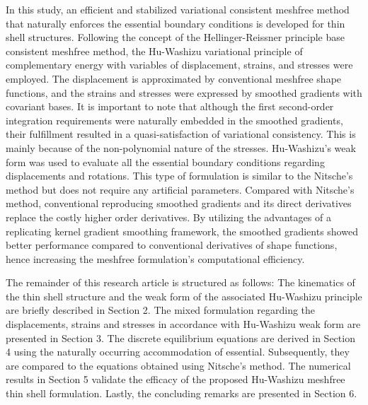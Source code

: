 In this study, an efficient and stabilized variational consistent meshfree method that naturally enforces the essential boundary conditions is developed for thin shell structures. Following the concept of the Hellinger-Reissner principle base consistent meshfree method, the Hu-Washizu variational principle of complementary energy with variables of displacement, strains, and stresses were employed. The displacement is approximated by conventional meshfree shape functions, and the strains and stresses were expressed by smoothed gradients with covariant bases. It is important to note that although the first second-order integration requirements were naturally embedded in the smoothed gradients, their fulfillment resulted in a quasi-satisfaction of variational consistency. This is mainly because of the non-polynomial nature of the stresses. Hu-Washizu's weak form was used to evaluate all the essential boundary conditions regarding displacements and rotations. This type of formulation is similar to the Nitsche's method but does not require any artificial parameters. Compared with Nitsche’s method, conventional reproducing smoothed gradients and its direct derivatives replace the costly higher order derivatives. By utilizing the advantages of a replicating kernel gradient smoothing framework, the smoothed gradients showed better performance compared to conventional derivatives of shape functions, hence increasing the meshfree formulation's computational efficiency.

The remainder of this research article is structured as follows: The kinematics of the thin shell structure and the weak form of the associated Hu-Washizu principle are briefly described in Section 2. The mixed formulation regarding the displacements, strains and stresses in accordance with Hu-Washizu weak form are presented in Section 3. The discrete equilibrium equations are derived in Section 4 using the naturally occurring accommodation of essential. Subsequently, they are compared to the equations obtained using Nitsche's method. The numerical results in Section 5 validate the efficacy of the proposed Hu-Washizu meshfree thin shell formulation. Lastly, the concluding remarks are presented in Section 6.

